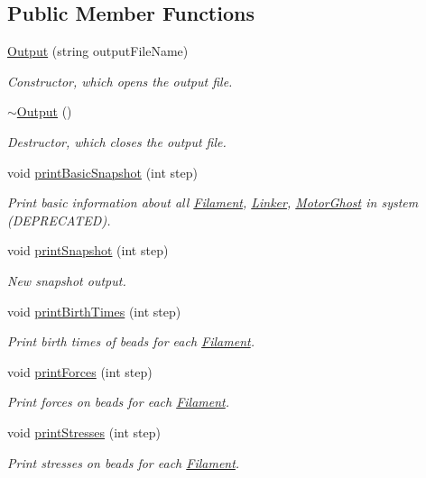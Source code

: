 \subsection*{Public Member Functions}
\begin{DoxyCompactItemize}
\item 
\hyperlink{classOutput_a75c8133d932621debacb30634ef5258c}{Output} (string output\+File\+Name)
\begin{DoxyCompactList}\small\item\em Constructor, which opens the output file. \end{DoxyCompactList}\item 
\hyperlink{classOutput_a61d0840daf98bea49e4dc471f235eeab}{$\sim$\+Output} ()
\begin{DoxyCompactList}\small\item\em Destructor, which closes the output file. \end{DoxyCompactList}\item 
void \hyperlink{classOutput_ad35067cbcca30c5cea00735d1d11f2b5}{print\+Basic\+Snapshot} (int step)
\begin{DoxyCompactList}\small\item\em Print basic information about all \hyperlink{classFilament}{Filament}, \hyperlink{classLinker}{Linker}, \hyperlink{classMotorGhost}{Motor\+Ghost} in system (D\+E\+P\+R\+E\+C\+A\+T\+E\+D). \end{DoxyCompactList}\item 
void \hyperlink{classOutput_a786eca35e9c06d89eab804c67b314e61}{print\+Snapshot} (int step)
\begin{DoxyCompactList}\small\item\em New snapshot output. \end{DoxyCompactList}\item 
void \hyperlink{classOutput_a1ca68aeb9bbffdcdc2a1d473ed923ceb}{print\+Birth\+Times} (int step)
\begin{DoxyCompactList}\small\item\em Print birth times of beads for each \hyperlink{classFilament}{Filament}. \end{DoxyCompactList}\item 
void \hyperlink{classOutput_a86a58b2b083f2a6043ad30b8c3d14ba0}{print\+Forces} (int step)
\begin{DoxyCompactList}\small\item\em Print forces on beads for each \hyperlink{classFilament}{Filament}. \end{DoxyCompactList}\item 
void \hyperlink{classOutput_acb72afbff4487898488cdfd6a829ce45}{print\+Stresses} (int step)
\begin{DoxyCompactList}\small\item\em Print stresses on beads for each \hyperlink{classFilament}{Filament}. \end{DoxyCompactList}\end{DoxyCompactItemize}
